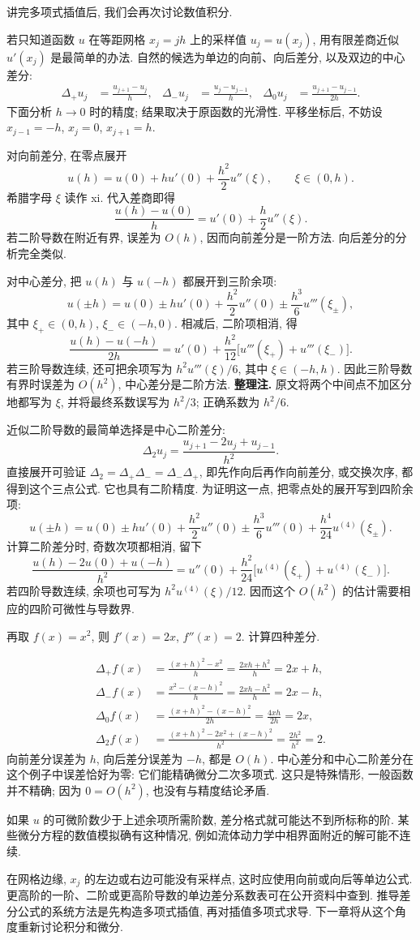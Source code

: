 讲完多项式插值后, 我们会再次讨论数值积分.


若只知道函数 $u$ 在等距网格 $x_j=jh$ 上的采样值 $u_j=u(x_j)$, 用有限差商近似 $u'(x_j)$ 是最简单的办法. 自然的候选为单边的向前、向后差分, 以及双边的中心差分:
\begin{align*}
\Delta_+u_j&=\frac{u_{j+1}-u_j}{h},&
\Delta_-u_j&=\frac{u_j-u_{j-1}}{h},&
\Delta_0u_j&=\frac{u_{j+1}-u_{j-1}}{2h}.
\end{align*}
下面分析 $h\to0$ 时的精度; 结果取决于原函数的光滑性. 平移坐标后, 不妨设 $x_{j-1}=-h$, $x_j=0$, $x_{j+1}=h$.

对向前差分, 在零点展开
\[
u(h)=u(0)+hu'(0)+\frac{h^2}{2}u''(\xi),\qquad \xi\in(0,h).
\]
希腊字母 $\xi$ 读作 xi. 代入差商即得
\[
\frac{u(h)-u(0)}h=u'(0)+\frac h2u''(\xi).
\]
若二阶导数在附近有界, 误差为 $O(h)$, 因而向前差分是一阶方法. 向后差分的分析完全类似.

对中心差分, 把 $u(h)$ 与 $u(-h)$ 都展开到三阶余项:
\[
u(\pm h)=u(0)\pm hu'(0)+\frac{h^2}{2}u''(0)\pm\frac{h^3}{6}u'''(\xi_\pm),
\]
其中 $\xi_+\in(0,h)$, $\xi_-\in(-h,0)$. 相减后, 二阶项相消, 得
\[
\frac{u(h)-u(-h)}{2h}=u'(0)+\frac{h^2}{12}\bigl[u'''(\xi_+)+u'''(\xi_-)\bigr].
\]
若三阶导数连续, 还可把余项写为 $h^2u'''(\xi)/6$, 其中 $\xi\in(-h,h)$. 因此三阶导数有界时误差为 $O(h^2)$, 中心差分是二阶方法. \textbf{整理注.} 原文将两个中间点不加区分地都写为 $\xi$, 并将最终系数误写为 $h^2/3$; 正确系数为 $h^2/6$.

近似二阶导数的最简单选择是中心二阶差分:
\[
\Delta_2u_j=\frac{u_{j+1}-2u_j+u_{j-1}}{h^2}.
\]
直接展开可验证 $\Delta_2=\Delta_+\Delta_-=\Delta_-\Delta_+$, 即先作向后再作向前差分, 或交换次序, 都得到这个三点公式. 它也具有二阶精度. 为证明这一点, 把零点处的展开写到四阶余项:
\[
u(\pm h)=u(0)\pm hu'(0)+\frac{h^2}{2}u''(0)\pm\frac{h^3}{6}u'''(0)+\frac{h^4}{24}u^{(4)}(\xi_\pm).
\]
计算二阶差分时, 奇数次项都相消, 留下
\[
\frac{u(h)-2u(0)+u(-h)}{h^2}
=u''(0)+\frac{h^2}{24}\bigl[u^{(4)}(\xi_+)+u^{(4)}(\xi_-)\bigr].
\]
若四阶导数连续, 余项也可写为 $h^2u^{(4)}(\xi)/12$. 因而这个 $O(h^2)$ 的估计需要相应的四阶可微性与导数界.

\begin{example}\label{ex:difference-square}
再取 $f(x)=x^2$, 则 $f'(x)=2x$, $f''(x)=2$. 计算四种差分.
\end{example}
\begin{solution}
\begin{align*}
\Delta_+f(x)&=\frac{(x+h)^2-x^2}{h}=\frac{2xh+h^2}{h}=2x+h,\\
\Delta_-f(x)&=\frac{x^2-(x-h)^2}{h}=\frac{2xh-h^2}{h}=2x-h,\\
\Delta_0f(x)&=\frac{(x+h)^2-(x-h)^2}{2h}=\frac{4xh}{2h}=2x,\\
\Delta_2f(x)&=\frac{(x+h)^2-2x^2+(x-h)^2}{h^2}=\frac{2h^2}{h^2}=2.
\end{align*}
向前差分误差为 $h$, 向后差分误差为 $-h$, 都是 $O(h)$. 中心差分和中心二阶差分在这个例子中误差恰好为零: 它们能精确微分二次多项式. 这只是特殊情形, 一般函数并不精确; 因为 $0=O(h^2)$, 也没有与精度结论矛盾.
\end{solution}

如果 $u$ 的可微阶数少于上述余项所需阶数, 差分格式就可能达不到所标称的阶. 某些微分方程的数值模拟确有这种情况, 例如流体动力学中相界面附近的解可能不连续.

在网格边缘, $x_j$ 的左边或右边可能没有采样点, 这时应使用向前或向后等单边公式. 更高阶的一阶、二阶或更高阶导数的单边差分系数表可在公开资料中查到. 推导差分公式的系统方法是先构造多项式插值, 再对插值多项式求导. 下一章将从这个角度重新讨论积分和微分.
